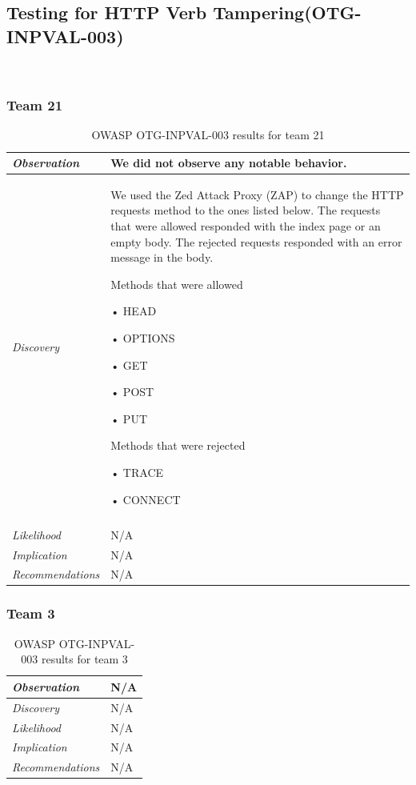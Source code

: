 \documentclass[headsepline,footsepline,footinclude=false,oneside,fontsize=11pt,paper=a4,listof=totoc,bibliography=totoc]{scrbook} %
\begin{document}
\subsection{Testing for HTTP Verb Tampering(OTG-INPVAL-003)}\

\subsubsection{Team 21}

\begin{table}[H]
	\centering
	\begin{tabular}{l p{11cm}} 
		\textit{Observation} &We did not observe any notable behavior.  \\ 
		\hline
		\textit{Discovery} &   We used the Zed  Attack  Proxy  (ZAP)	to change the HTTP requests method to the ones listed below. The requests that were allowed responded
		with the index page or an empty body. The rejected requests responded with an
		error message in the body.\
		
		Methods that were allowed\
		
		•	HEAD\
		
		•	OPTIONS\
		
		•	GET\
		
		•	POST\
		
		•	PUT  \
		
		Methods that were rejected\
		
		•	TRACE\
		
		•	CONNECT  \\\\
		\hline
		\textit{Likelihood} & N/A \\
		\hline
		\textit{Implication} & N/A\\
		\hline
		\textit{Recommendations} & N/A\\ 
	\end{tabular}
	\caption{OWASP OTG-INPVAL-003 results for team 21}
	\label{table:scenario2}
\end{table}

\subsubsection{Team 3}

\begin{table}[H]
	\centering
	\begin{tabular}{l p{11cm}} 
		\textit{Observation} &  N/A\\ 
		\hline
		\textit{Discovery} &  N/A \\
		\hline
		\textit{Likelihood} & N/A\\
		\hline
		\textit{Implication} & N/A\\
		\hline
		\textit{Recommendations} & N/A\\ 
	\end{tabular}
	\caption{OWASP OTG-INPVAL-003 results for team 3}
	\label{table:scenario2}
\end{table}    
\end{document}
